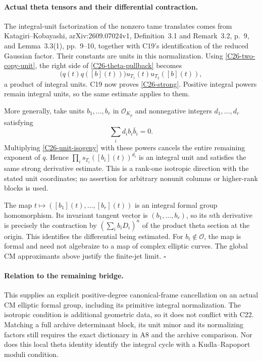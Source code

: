 \paragraph{Actual theta tensors and their differential contraction.}
The integral-unit factorization of the nonzero tame translates comes
from Katagiri--Kobayashi, arXiv:2609.07024v1,
Definition~3.1 and Remark~3.2, p.~9, and Lemma~3.3(1),
pp.~9--10, together with C19's identification of the reduced
Gaussian factor.  Their constants are units in this normalization.
Using \eqref{C26-two-copy-unit}, the right side of
\eqref{C26-theta-pullback} becomes
\[
       \bigl(q(t)q([b](t))\bigr)
          u_{T_1}(t)u_{T_2}([b](t)),
\]
a product of integral units.  C19 now proves
\eqref{C26-strong}.  Positive integral powers remain integral
units, so the same estimate applies to them.

More generally, take units $b_1,\ldots,b_r$ in
$\mathcal O_{K_p}$ and nonnegative integers $d_1,\ldots,d_r$
satisfying
\[
                  \sum_i d_i b_i\bar b_i=0.
\]
Multiplying \eqref{C26-unit-isogeny} with these powers cancels
the entire remaining exponent of $q$.  Hence
$\prod_i s_{T_i}([b_i](t))^{d_i}$ is an integral unit and
satisfies the same strong derivative estimate.
This is a rank-one isotropic direction with the stated
unit coordinates; no assertion for arbitrary nonunit columns
or higher-rank blocks is used.

The map $t\mapsto([b_1](t),\ldots,[b_r](t))$ is an integral
formal group homomorphism.  Its invariant tangent vector is
$(b_1,\ldots,b_r)$, so its $n$th derivative is precisely the
contraction by
$(\sum_i b_iD_i)^n$ of the product theta section at the origin.
This identifies the differential being estimated.  For
$b_i\notin\mathcal O$, the map is formal and need not
algebraize to a map of complex elliptic curves.
The global CM approximants above justify the finite-jet limit.
\hfill$\square$

\paragraph{Relation to the remaining bridge.}
This supplies an explicit positive-degree canonical-frame
cancellation on an actual CM elliptic formal group, including
its primitive integral normalization.  The isotropic condition
is additional geometric data, so it does not conflict with
C22.  Matching a full archive determinant block, its unit minor
and its normalizing factors still requires the exact dictionary
in A8 and the archive comparison.  Nor does this local
theta identity identify the integral cycle with a
Kudla--Rapoport moduli condition.
